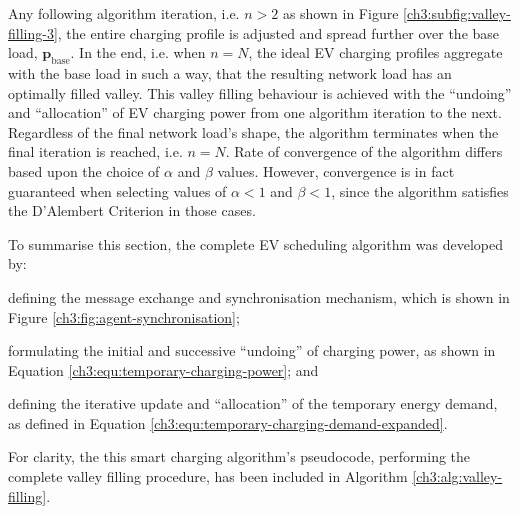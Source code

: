 Any following algorithm iteration, i.e. $n>2$ as shown in Figure \ref{ch3:subfig:valley-filling-3}, the entire charging profile is adjusted and spread further over the base load, $\textbf{p}_\text{base}$.
In the end, i.e. when $n=N$, the ideal EV charging profiles aggregate with the base load in such a way, that the resulting network load has an optimally filled valley.
This valley filling behaviour is achieved with the ``undoing'' and ``allocation'' of EV charging power from one algorithm iteration to the next.
Regardless of the final network load's shape, the algorithm terminates when the final iteration is reached, i.e. $n=N$.
Rate of convergence of the algorithm differs based upon the choice of $\alpha$ and $\beta$ values.
However, convergence is in fact guaranteed when selecting values of $\alpha < 1$ and $\beta < 1$, since the algorithm satisfies the D'Alembert Criterion in those cases.

To summarise this section, the complete EV scheduling algorithm was developed by: 
\begin{enumerate*}
	\item defining the message exchange and synchronisation mechanism, which is shown in Figure \ref{ch3:fig:agent-synchronisation};
	\item formulating the initial and successive ``undoing'' of charging power, as shown in Equation \ref{ch3:equ:temporary-charging-power}; and
	\item defining the iterative update and ``allocation'' of the temporary energy demand, as defined in Equation \ref{ch3:equ:temporary-charging-demand-expanded}.
\end{enumerate*}
For clarity, the this smart charging algorithm's pseudocode, performing the complete valley filling procedure, has been included in Algorithm \ref{ch3:alg:valley-filling}.















